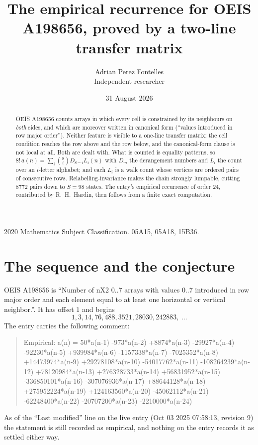\documentclass[11pt,a4paper]{article}
\title{The empirical recurrence for OEIS A198656, proved by a two-line transfer matrix}
\author{Adrian Perez Fontelles\\ \small Independent researcher}
\date{31 August 2026}
\theoremstyle{plain}
\theoremstyle{definition}
\begin{document}
\maketitle

\begin{abstract}
OEIS A198656 counts arrays in which every cell is constrained by its neighbours on \emph{both}
sides, and which are moreover written in canonical form (``values introduced in row major
order''). Neither feature is visible to a one-line transfer matrix: the cell condition
reaches the row above and the row below, and the canonical-form clause is not local at
all. Both are dealt with. What is counted is equality patterns, so
$8!\,a(n)=\sum_i\binom{8}{i}D_{8-i}L_i(n)$ with $D_m$ the derangement numbers and
$L_i$ the count over an $i$-letter alphabet; and each $L_i$ is a walk count whose vertices
are ordered pairs of consecutive rows. Relabelling-invariance makes the chain strongly
lumpable, cutting $8772$ pairs down to $S=98$ states. The entry's empirical recurrence of
order $24$, contributed by R.~H.~Hardin, then follows from a finite exact computation.
\end{abstract}

\noindent\small 2020 Mathematics Subject Classification. 05A15, 05A18, 15B36.\normalsize

\section{The sequence and the conjecture}

OEIS A198656 is ``Number of nX2 0..7 arrays with values 0..7 introduced in row major order and each element equal to at least one horizontal or vertical neighbor.''. It has offset $1$ and begins
\[
1, 3, 14, 76, 488, 3521, 28030, 242883,\ \dots
\]
The entry carries the following comment:
\begin{quote}\small
Empirical: a(n) = 50*a(n-1) -973*a(n-2) +8874*a(n-3) -29927*a(n-4) -92230*a(n-5) +939984*a(n-6) -1157338*a(n-7) -7025352*a(n-8) +14473974*a(n-9) +29278108*a(n-10) -54017762*a(n-11) -108264239*a(n-12) +78120984*a(n-13) +276328733*a(n-14) +56831952*a(n-15) -336850101*a(n-16) -307076936*a(n-17) +88644128*a(n-18) +275952224*a(n-19) +124163560*a(n-20) -45062112*a(n-21) -62248400*a(n-22) -20707200*a(n-23) -2210000*a(n-24)
\end{quote}
As of the ``Last modified'' line on the live entry (Oct 03 2025 07:58:13, revision 9) the statement is
still recorded as empirical, and nothing on the entry records it as settled either way.
\end{document}
